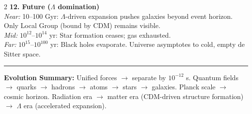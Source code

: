 \begin{center}
\begin{tcolorbox}
\begin{multicols}{2}
{\bfseries 12. Future ($\Lambda$ domination)}\\
\textit{Near:} 10–100 Gyr: $\Lambda$-driven expansion pushes galaxies beyond event horizon. Only Local Group (bound by CDM) remains visible.\\
\textit{Mid:} $10^{12}$–$10^{14}$ yr: Star formation ceases; gas exhausted.\\
\textit{Far:} $10^{15}$–$10^{100}$ yr: Black holes evaporate. Universe asymptotes to cold, empty de Sitter space.

\end{multicols}

\vspace{4pt}
\hrule
\vspace{4pt}
{\footnotesize\textbf{Evolution Summary:} Unified forces $\rightarrow$ separate by $10^{-12}$ s. Quantum fields $\rightarrow$ quarks $\rightarrow$ hadrons $\rightarrow$ atoms $\rightarrow$ stars $\rightarrow$ galaxies. Planck scale $\rightarrow$ cosmic horizon. Radiation era $\rightarrow$ matter era (CDM-driven structure formation) $\rightarrow$ $\Lambda$ era (accelerated expansion).}

\end{tcolorbox}
\end{center}
